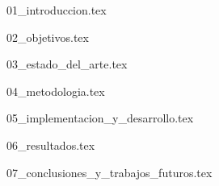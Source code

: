 \documentclass[hidelinks, headlogo, framedcover]{tfeEPCC}
\begin{document}


\cleardoublepage
{}
\pagestyle{fancy}
\setcounter{page}{1}

{01_introduccion.tex}

{02_objetivos.tex}

{03_estado_del_arte.tex}

{04_metodologia.tex}

{05_implementacion_y_desarrollo.tex}

{06_resultados.tex}

{07_conclusiones_y_trabajos_futuros.tex}


\end{document}
